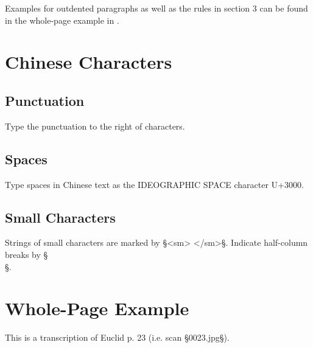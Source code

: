 \documentclass[fontsize=11pt, paper=a4, 
DIV15,
normalheadings,
parskip=half-, 
pointlessnumbers]{scrartcl}
\begin{document}
\begin{note}
Examples for outdented paragraphs as well as the rules in section 3 can be found in the whole-page example in .
\end{note}

\section{Chinese Characters}

\subsection{Punctuation}

Type the punctuation to the right of characters.

\subsection{Spaces}

Type spaces in Chinese text as the IDEOGRAPHIC SPACE character U+3000.

\subsection{Small Characters}

Strings of small characters are marked by §<sm> </sm>§. Indicate half-column breaks by §\\§. 

\section{Whole-Page Example}
\label{section example}

This is a transcription of Euclid p. 23 (i.e. scan §0023.jpg§).

\newcommand{\chin}[1]{{\fontspec{SimSun}{#1}}}
\end{document}
